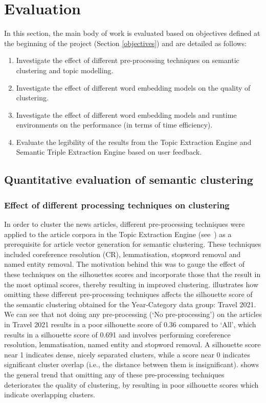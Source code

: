 \chapter{Evaluation}   \label{ch:6:eval}

In this section, the main body of work is evaluated based on objectives defined at the beginning of the project (Section \ref{objectives}) and are detailed as follows:
\begin{enumerate}
    \item Investigate the effect of different pre-processing techniques on semantic clustering and topic modelling.
    \item Investigate the effect of different word embedding models on the quality of clustering.
    \item Investigate the effect of different word embedding models and runtime environments on the performance (in terms of time efficiency).
    \item Evaluate the legibility of the results from the Topic Extraction Engine and Semantic Triple Extraction Engine based on user feedback.
\end{enumerate}

\section{Quantitative evaluation of semantic clustering} \label{s:evaluation_semantic_clustering}

\subsection{Effect of different processing techniques on clustering} \label{s:preprocess_clustering}

In order to cluster the news articles, different pre-processing techniques were applied to the article corpora in the Topic Extraction Engine (see~) as a prerequisite for article vector generation for semantic clustering. These techniques included coreference resolution (CR), lemmatisation, stopword removal and named entity removal. The motivation behind this was to gauge the effect of these techniques on the silhouettes scores and incorporate those that the result in the most optimal scores, thereby resulting in improved clustering.  illustrates how omitting these different pre-processing techniques affects the silhouette score of the semantic clustering obtained for the Year-Category data group: Travel 2021. We can see that not doing any pre-processing (`No pre-processing') on the articles in Travel 2021 results in a poor silhouette score of 0.36 compared to `All', which results in a silhouette score of 0.691 and involves performing coreference resolution, lemmatisation, named entity and stopword removal. A silhouette score near 1 indicates dense, nicely separated clusters, while a score near 0 indicates significant cluster overlap (i.e., the distance between them is insignificant).  shows the general trend that omitting any of these pre-processing techniques deteriorates the quality of clustering, by resulting in poor silhouette scores which indicate overlapping clusters.

